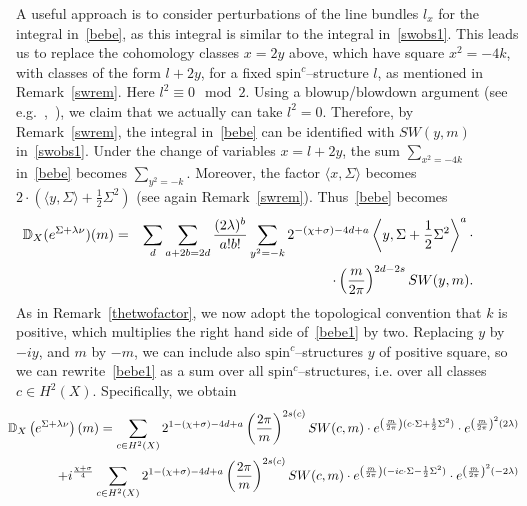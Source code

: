 \documentclass[a4paper,12pt,reqno,sumlimits]{amsart}
\theoremstyle{plain}
\theoremstyle{definition}
\newcommand{\D}{{\mathbb D}}
\newcommand{\1}{{\bf 1}}
\newcommand{\spinc}{$\text{spin}^c$}
\newcommand{\ip}[1]{\langle #1 \rangle}
\numberwithin{equation}{section}
\begin{document}
A useful approach is to consider perturbations of the line bundles $l_x$ for
the integral in~\eqref{bebe}, as this integral is similar to the integral
in~\eqref{swobs1}.  This leads us to replace the cohomology classes $x=2y$
above, which have square $x^2=-4k$, with classes of the form $l+2y$, for a
fixed \spinc--structure $l$, as mentioned in Remark~\ref{swrem}. Here
$l^2\equiv 0\mod 2$.  Using a blowup/blowdown argument (see
e.g.~\cite{fs1},~\cite{fs2}), we claim that we actually can take $l^2=0$.
Therefore, by Remark~\ref{swrem}, the integral in~\eqref{bebe} can be
identified with $SW(y,m)$ in~\eqref{swobs1}.  Under the change of variables
$x=l+2y$, the sum $\displaystyle\sum_{x^2=-4k}$ in~\eqref{bebe} becomes
$\displaystyle\sum_{y^2=-k}$.  Moreover, the factor $\ip{x,\Sigma}$ becomes
$2\cdot\left(\ip{y,\Sigma}+\frac{1}{2}\Sigma^2\right)$ (see again
Remark~\ref{swrem}). Thus~\eqref{bebe} becomes
\begin{eqnarray}
  \label{bebe1}
  \hspace{-1cm}\D_X(e^{\Sigma+\lambda\nu})(m) &=&
  \sum_d\sum_{a+2b=2d}\frac{(2\lambda)^{b}}{a!b!}
  \sum_{y^2=-k} 2^{-(\chi+\sigma)-4d+a}
  \left\langle y,\Sigma + \frac{1}{2}\Sigma^2\right\rangle^{a}\cdot\nonumber\\
  &&\qquad\qquad\qquad\qquad\qquad\cdot
  \left(\frac{m}{2\pi}\right)^{2d-2s} SW(y,m).
\end{eqnarray}
As in Remark~\ref{thetwofactor}, we now adopt the topological convention that
$k$ is positive, which multiplies the right hand side of~\eqref{bebe1} by
two. Replacing $y$ by $-iy$, and $m$ by $-m$, we can include also
\spinc--structures $y$ of positive square, so we can rewrite~\eqref{bebe1} as
a sum over all \spinc--structures, i.e. over all classes $c\in H^2(X)$.
Specifically, we obtain
\begin{eqnarray}
  \label{bebe2}
  &&\hspace{-1cm}\D_X\left(e^{\Sigma+\lambda\nu}\right)(m) = 
  \sum_{c\in H^2(X)} 2^{1-(\chi+\sigma)-4d+a}
  \left(\frac{2\pi}{m}\right)^{2s(c)}
  SW(c,m)\cdot e^{\left(\frac{m}{2\pi}\right)(c\cdot\Sigma+\frac{1}{2}\Sigma^2)}
  \cdot e^{\left(\frac{m}{2\pi}\right)^2 (2\lambda)}\nonumber\\
  &&\qquad + i^{\frac{\chi+\sigma}{4}}
  \sum_{c\in H^2(X)} 2^{1-(\chi+\sigma)-4d+a}
  \left(\frac{2\pi}{m}\right)^{2s(c)}
  SW(c,m)\cdot e^{\left(\frac{m}{2\pi}\right)(-ic\cdot\Sigma-\frac{1}{2}\Sigma^2)}
  \cdot e^{\left(\frac{m}{2\pi}\right)^2 (-2\lambda)}\nonumber\\
  \,
\end{eqnarray}
\end{document}
